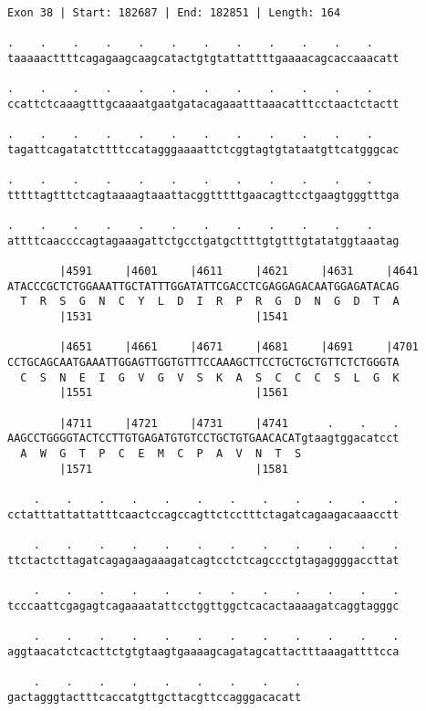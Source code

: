 \documentclass{article}
\begin{document}
\begin{Verbatim}[fontfamily=courier]
Exon 38 | Start: 182687 | End: 182851 | Length: 164

.    .    .    .    .    .    .    .    .    .    .    .    
taaaaacttttcagagaagcaagcatactgtgtattattttgaaaacagcaccaaacatt

.    .    .    .    .    .    .    .    .    .    .    .    
ccattctcaaagtttgcaaaatgaatgatacagaaatttaaacatttcctaactctactt

.    .    .    .    .    .    .    .    .    .    .    .    
tagattcagatatcttttccatagggaaaattctcggtagtgtataatgttcatgggcac

.    .    .    .    .    .    .    .    .    .    .    .    
tttttagtttctcagtaaaagtaaattacggtttttgaacagttcctgaagtgggtttga

.    .    .    .    .    .    .    .    .    .    .    .    
attttcaaccccagtagaaagattctgcctgatgcttttgtgtttgtatatggtaaatag

        |4591     |4601     |4611     |4621     |4631     |4641
ATACCCGCTCTGGAAATTGCTATTTGGATATTCGACCTCGAGGAGACAATGGAGATACAG
  T  R  S  G  N  C  Y  L  D  I  R  P  R  G  D  N  G  D  T  A
        |1531                         |1541                 

        |4651     |4661     |4671     |4681     |4691     |4701
CCTGCAGCAATGAAATTGGAGTTGGTGTTTCCAAAGCTTCCTGCTGCTGTTCTCTGGGTA
  C  S  N  E  I  G  V  G  V  S  K  A  S  C  C  C  S  L  G  K
        |1551                         |1561                 

        |4711     |4721     |4731     |4741      .    .    .
AAGCCTGGGGTACTCCTTGTGAGATGTGTCCTGCTGTGAACACATgtaagtggacatcct
  A  W  G  T  P  C  E  M  C  P  A  V  N  T  S               
        |1571                         |1581                 

    .    .    .    .    .    .    .    .    .    .    .    .
cctatttattattatttcaactccagccagttctcctttctagatcagaagacaaacctt

    .    .    .    .    .    .    .    .    .    .    .    .
ttctactcttagatcagagaagaaagatcagtcctctcagccctgtagaggggaccttat

    .    .    .    .    .    .    .    .    .    .    .    .
tcccaattcgagagtcagaaaatattcctggttggctcacactaaaagatcaggtagggc

    .    .    .    .    .    .    .    .    .    .    .    .
aggtaacatctcacttctgtgtaagtgaaaagcagatagcattactttaaagattttcca

    .    .    .    .    .    .    .    .    .
gactagggtactttcaccatgttgcttacgttccagggacacatt
\end{Verbatim}
\end{document}
